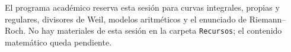 \begin{nota}
El programa académico reserva esta sesión para curvas integrales, propias y regulares, divisores de Weil, modelos aritméticos y el enunciado de Riemann--Roch. No hay materiales de esta sesión en la carpeta \texttt{Recursos}; el contenido matemático queda pendiente.
\end{nota}
